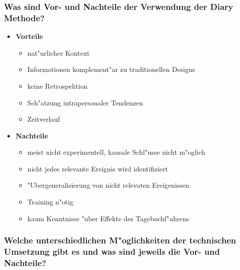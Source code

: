 \subsubsection{Was sind Vor- und Nachteile der Verwendung der Diary Methode?}
\begin{itemize}
        \item \textbf{Vorteile}
                \begin{itemize}
                        \item nat"urlicher Kontext
                        \item Informationen komplement"ar zu traditionellen Designs
                        \item keine Retrospektion
                        \item Sch"atzung intrapersonaler Tendenzen
                        \item Zeitverlauf
                \end{itemize}
        \item \textbf{Nachteile}
                \begin{itemize}
                        \item meist nicht experimentell, kausale Schl"usse nicht m"oglich
                        \item nicht jedes relevante Ereignis wird identifiziert
                        \item "Ubergeneralisierung von nicht relevaten Ereigenissen
                        \item Training n"otig
                        \item kaum Kenntnisse "uber Effekte des Tagebuchf"uhrens
                \end{itemize}
\end{itemize}

\subsubsection{Welche unterschiedlichen M"oglichkeiten der technischen Umsetzung gibt es und was sind jeweils die Vor- und Nachteile?}
